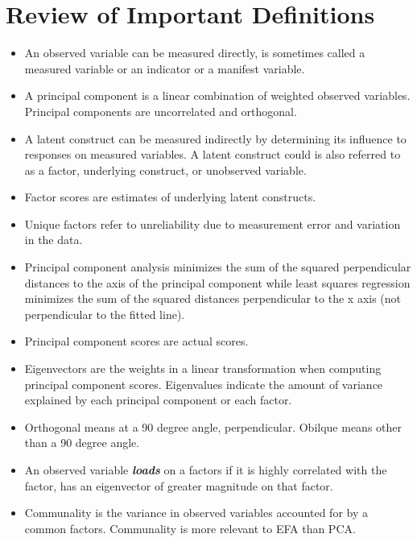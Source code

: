 \documentclass[a4paper,12pt]{article}
\begin{document}
\section{Review of Important Definitions}
\begin{itemize}
\item An observed variable can be measured directly, is sometimes called a measured variable or an indicator or a
manifest variable.
\item A principal component is a linear combination of weighted observed variables. Principal components are
uncorrelated and orthogonal.
\item A latent construct can be measured indirectly by determining its influence to responses on measured variables. A latent construct could is also referred to as a factor, underlying construct, or unobserved variable.
\item Factor scores are estimates of underlying latent constructs.
\item Unique factors refer to unreliability due to measurement error and variation in the data.
\item Principal component analysis minimizes the sum of the squared perpendicular distances to the axis of the
principal component while least squares regression minimizes the sum of the squared distances perpendicular to the
x axis (not perpendicular to the fitted line).
\item Principal component scores are actual scores.
\item Eigenvectors are the weights in a linear transformation when computing principal component scores.
Eigenvalues indicate the amount of variance explained by each principal component or each factor.
\item Orthogonal means at a 90 degree angle, perpendicular.
Obilque means other than a 90 degree angle.
\item An observed variable \textbf{\emph{loads}} on a factors if it is highly correlated with the factor, has an eigenvector of greater magnitude on that factor.
\item Communality is the variance in observed variables accounted for by a common factors. Communality is more
relevant to EFA than PCA.
\end{itemize}
\end{document}
